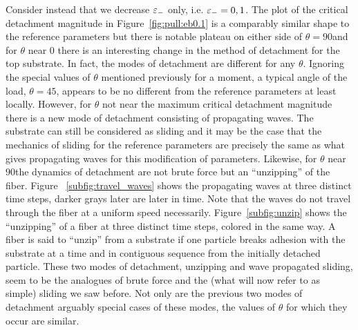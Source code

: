 Consider instead that we decrease $\varepsilon_-$ only, i.e. $\varepsilon_-=0,1$. The plot of the critical detachment magnitude in Figure~\ref{fig:pull:eb0.1} is a comparably similar shape to the reference parameters but there is notable plateau on either side of $\theta=90$\textdegree and for $\theta$ near $0$ there is an interesting change in the method of detachment for the top substrate. In fact, the modes of detachment are different for any $\theta$. Ignoring the special values of $\theta$ mentioned previously for a moment, a typical angle of the load, $\theta=45$\textdegree, appears to be no different from the reference parameters at least locally. However, for $\theta$ not near the maximum critical detachment magnitude there is a new mode of detachment consisting of propagating waves. The substrate can still be considered as sliding and it may be the case that the mechanics of sliding for the reference parameters are precisely the same as what gives propagating waves for this modification of parameters. Likewise, for $\theta$ near $90$\textdegree the dynamics of detachment are not brute force but an ``unzipping'' of the fiber. Figure	~\ref{subfig:travel_waves} shows the propagating waves at three distinct time steps, darker grays later are later in time. Note that the waves do not travel through the fiber at a uniform speed necessarily. Figure~\ref{subfig:unzip} shows the ``unzipping'' of a fiber at three distinct time steps, colored in the same way. A fiber is said to ``unzip'' from a substrate if one particle breaks adhesion with the substrate at a time and in contiguous sequence from the initially detached particle. These two modes of detachment, unzipping and wave propagated sliding, seem to be the analogues of brute force and the (what will now refer to as simple) sliding we saw before. Not only are the previous two modes of detachment arguably special cases of these modes, the values of $\theta$ for which they occur are similar.

